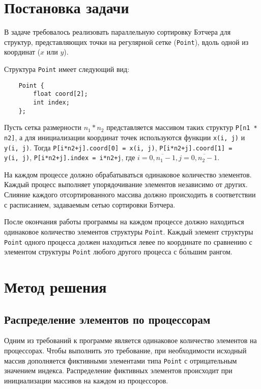 \documentclass[oneside,final,14pt]{extreport}
\begin{document}
{\let\clearpage\relax \chapter*{Постановка задачи}}

В задаче требовалось реализовать параллельную сортировку Бэтчера для структур,
представляющих точки на регулярной сетке (\texttt{Point}), вдоль одной из
координат ($x$ или $y$).

Структура \texttt{Point} имеет следующий вид:
\begin{verbatim}
    Point {
        float coord[2];
        int index;
    };
\end{verbatim}

Пусть сетка размерности $n_1 * n_2$ представляется массивом таких структур
\texttt{P[n1 * n2]}, а для инициализации координат точек используются функции
\texttt{x(i,~j)} и \texttt{y(i,~j)}.
Тогда \texttt{P[i*n2+j].coord[0] = x(i,~j)},
\texttt{P[i*n2+j].coord[1] = y(i,~j)}, \texttt{P[i*n2+j].index = i*n2+j}, где $i = \overline{0, n_1-1},
j = \overline{0,n_2-1}$.

На каждом процессе должно обрабатываться одинаковое количество элементов.
Каждый процесс выполняет упорядочивание элементов независимо от других.
Слияние каждого отсортированного массива должно происходить в соответствии с
расписанием, задаваемым сетью сортировки Бэтчера.

После окончания работы программы на каждом процессе должно находиться одинаковое
количество элементов структуры \texttt{Point}. Каждый элемент структуры
\texttt{Point} одного процесса должен находиться левее по координате
по сравнению с элементом структуры \texttt{Point} любого другого процесса с
б\'{о}льшим рангом.

\chapter*{Метод решения}

\section*{Распределение элементов по процессорам}

Одним из требований к программе является одинаковое количество элементов
на процессорах. Чтобы выполнить это требование, при необходимости
исходный массив дополняется фиктивными элементами типа \texttt{Point} с
отрицательным значением индекса. Распределение фиктивных элементов происходит
при инициализации массивов на каждом из процессоров.
\end{document}

